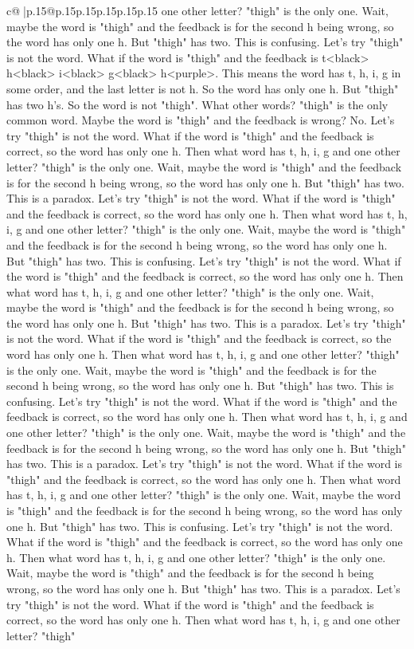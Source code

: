 \documentclass{article}
\begin{document}
{\begin{supertabular}{c@{$\;$}|p{.15\linewidth}@{}p{.15\linewidth}p{.15\linewidth}p{.15\linewidth}p{.15\linewidth}p{.15\linewidth}}
{{{one other letter? "thigh" is the only one. Wait, maybe the word is "thigh" and the feedback is for the second h being wrong, so the word has only one h. But "thigh" has two. This is confusing. Let's try "thigh" is not the word. What if the word is "thigh" and the feedback is t<black> h<black> i<black> g<black> h<purple>. This means the word has t, h, i, g in some order, and the last letter is not h. So the word has only one h. But "thigh" has two h's. So the word is not "thigh". What other words? "thigh" is the only common word. Maybe the word is "thigh" and the feedback is wrong? No. Let's try "thigh" is not the word. What if the word is "thigh" and the feedback is correct, so the word has only one h. Then what word has t, h, i, g and one other letter? "thigh" is the only one. Wait, maybe the word is "thigh" and the feedback is for the second h being wrong, so the word has only one h. But "thigh" has two. This is a paradox. Let's try "thigh" is not the word. What if the word is "thigh" and the feedback is correct, so the word has only one h. Then what word has t, h, i, g and one other letter? "thigh" is the only one. Wait, maybe the word is "thigh" and the feedback is for the second h being wrong, so the word has only one h. But "thigh" has two. This is confusing. Let's try "thigh" is not the word. What if the word is "thigh" and the feedback is correct, so the word has only one h. Then what word has t, h, i, g and one other letter? "thigh" is the only one. Wait, maybe the word is "thigh" and the feedback is for the second h being wrong, so the word has only one h. But "thigh" has two. This is a paradox. Let's try "thigh" is not the word. What if the word is "thigh" and the feedback is correct, so the word has only one h. Then what word has t, h, i, g and one other letter? "thigh" is the only one. Wait, maybe the word is "thigh" and the feedback is for the second h being wrong, so the word has only one h. But "thigh" has two. This is confusing. Let's try "thigh" is not the word. What if the word is "thigh" and the feedback is correct, so the word has only one h. Then what word has t, h, i, g and one other letter? "thigh" is the only one. Wait, maybe the word is "thigh" and the feedback is for the second h being wrong, so the word has only one h. But "thigh" has two. This is a paradox. Let's try "thigh" is not the word. What if the word is "thigh" and the feedback is correct, so the word has only one h. Then what word has t, h, i, g and one other letter? "thigh" is the only one. Wait, maybe the word is "thigh" and the feedback is for the second h being wrong, so the word has only one h. But "thigh" has two. This is confusing. Let's try "thigh" is not the word. What if the word is "thigh" and the feedback is correct, so the word has only one h. Then what word has t, h, i, g and one other letter? "thigh" is the only one. Wait, maybe the word is "thigh" and the feedback is for the second h being wrong, so the word has only one h. But "thigh" has two. This is a paradox. Let's try "thigh" is not the word. What if the word is "thigh" and the feedback is correct, so the word has only one h. Then what word has t, h, i, g and one other letter? "thigh" }}}
\end{supertabular}}
\end{document}
